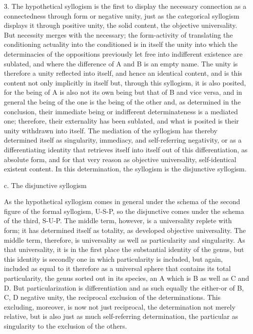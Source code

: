 3. The hypothetical syllogism is the first
to display the necessary connection
as a connectedness through form or negative unity,
just as the categorical syllogism displays
it through positive unity,
the solid content, the objective universality.
But necessity merges with the necessary;
the form-activity of translating
the conditioning actuality into the conditioned
is in itself the unity into which
the determinacies of the oppositions
previously let free into indifferent existence are sublated,
and where the difference of A and B is an empty name.
The unity is therefore a unity reflected into itself,
and hence an identical content,
and is this content not only implicitly in itself
but, through this syllogism, it is also posited,
for the being of A is also not its own being
but that of B and vice versa,
and in general the being of the one
is the being of the other
and, as determined in the conclusion,
their immediate being or indifferent determinateness
is a mediated one;
therefore, their externality has been sublated,
and what is posited is their unity withdrawn into itself.
The mediation of the syllogism has thereby determined itself
as singularity, immediacy, and self-referring negativity,
or as a differentiating identity that retrieves itself
into itself out of this differentiation, as absolute form,
and for that very reason as objective universality,
self-identical existent content.
In this determination,
the syllogism is the disjunctive syllogism.

c. The disjunctive syllogism

As the hypothetical syllogism comes in general
under the schema of the second figure of
the formal syllogism, U-S-P,
so the disjunctive comes
under the schema of the third, S-U-P.
The middle term, however, is
a universality replete with form;
it has determined itself as totality,
as developed objective universality.
The middle term, therefore,
is universality as well as
particularity and singularity.
As that universality,
it is in the first place
the substantial identity of the genus,
but this identity is secondly one
in which particularity is included,
but again, included as equal to it
therefore as a universal sphere
that contains its total particularity,
the genus sorted out in its species,
an A which is B as well as C and D.
But particularization is differentiation
and as such equally the either-or of B, C, D negative unity,
the reciprocal exclusion of the determinations.
This excluding, moreover, is now not just reciprocal,
the determination not merely relative,
but is also just as much self-referring determination,
the particular as singularity to the exclusion of the others.

